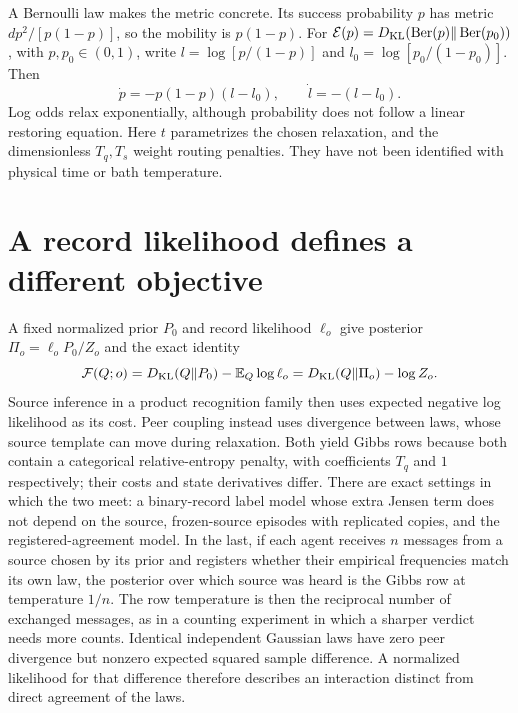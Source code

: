 A Bernoulli law makes the metric concrete. Its success probability $p$ has metric $dp^2/[p(1-p)]$, so the mobility is $p(1-p)$. For $\mathcal E(p)=D_{\mathrm{KL}}(\operatorname{Ber}(p)\Vert\operatorname{Ber}(p_0))$, with $p,p_0\in(0,1)$, write $l=\log[p/(1-p)]$ and $l_0=\log[p_0/(1-p_0)]$. Then
\begin{equation}
 \dot p=-p(1-p)(l-l_0),\qquad
 \dot l=-(l-l_0).
 \label{eq:comp-bernoulli-flow}
\end{equation}
Log odds relax exponentially, although probability does not follow a linear restoring equation. Here $t$ parametrizes the chosen relaxation, and the dimensionless $T_q,T_s$ weight routing penalties. They have not been identified with physical time or bath temperature.

\section{A record likelihood defines a different objective}

A fixed normalized prior $P_0$ and record likelihood $\ell_o$ give posterior $\Pi_o=\ell_oP_0/Z_o$ and the exact identity
\begin{equation}
 \mathcal F(Q;o)=D_{\mathrm{KL}}(Q\Vert P_0)-\mathbb E_Q\log\ell_o
               =D_{\mathrm{KL}}(Q\Vert\Pi_o)-\log Z_o.
 \label{eq:comp-record-vfe}
\end{equation}
Source inference in a product recognition family then uses expected negative log likelihood as its cost. Peer coupling instead uses divergence between laws, whose source template can move during relaxation. Both yield Gibbs rows because both contain a categorical relative-entropy penalty, with coefficients $T_q$ and $1$ respectively; their costs and state derivatives differ. There are exact settings in which the two meet: a binary-record label model whose extra Jensen term does not depend on the source, frozen-source episodes with replicated copies, and the registered-agreement model. In the last, if each agent receives $n$ messages from a source chosen by its prior and registers whether their empirical frequencies match its own law, the posterior over which source was heard is the Gibbs row at temperature $1/n$. The row temperature is then the reciprocal number of exchanged messages, as in a counting experiment in which a sharper verdict needs more counts. Identical independent Gaussian laws have zero peer divergence but nonzero expected squared sample difference. A normalized likelihood for that difference therefore describes an interaction distinct from direct agreement of the laws.
